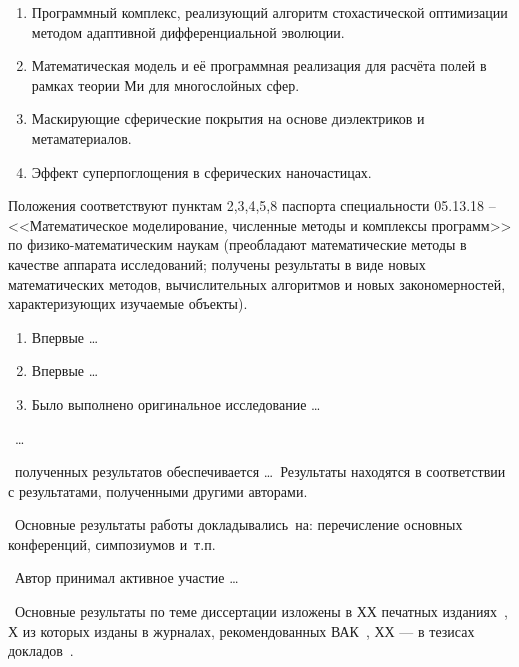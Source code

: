 \begin{enumerate}
  \item Программный комплекс, реализующий алгоритм стохастической
    оптимизации методом адаптивной дифференциальной эволюции.
  \item Математическая модель и её программная реализация для расчёта
    полей в рамках теории Ми для многослойных сфер.
  \item Маскирующие сферические покрытия на основе диэлектриков и метаматериалов.
  \item Эффект суперпоглощения в сферических наночастицах.
\end{enumerate}
Положения соответствуют пунктам 2,3,4,5,8 паспорта специальности
05.13.18 -- <<Математическое моделирование, численные методы и
комплексы программ>> по физико-математическим наукам (преобладают
математические методы в качестве аппарата исследований; получены
результаты в виде новых математических методов, вычислительных
алгоритмов и новых закономерностей, характеризующих изучаемые
объекты).

\novelty
\begin{enumerate}
  \item Впервые \ldots
  \item Впервые \ldots
  \item Было выполнено оригинальное исследование \ldots
\end{enumerate}

\influence\ \ldots

\reliability\ полученных результатов обеспечивается \ldots \ Результаты находятся в соответствии с результатами, полученными другими авторами.

\probation\
Основные результаты работы докладывались~на:
перечисление основных конференций, симпозиумов и~т.\:п.

\contribution\ Автор принимал активное участие \ldots

\publications\ Основные результаты по теме диссертации изложены в ХХ печатных изданиях~\cite{Sokolov,Gaidaenko,Lermontov,Management},
Х из которых изданы в журналах, рекомендованных ВАК~\cite{Sokolov,Gaidaenko}, 
ХХ --- в тезисах докладов~\cite{Lermontov,Management}.
